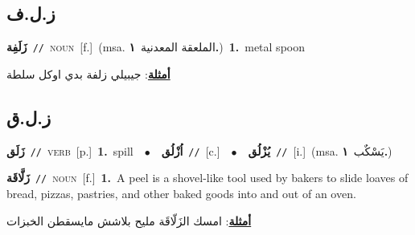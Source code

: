 \documentclass[10pt,a4paper,twoside]{article} %
\begin{document}
\begin{multicols}{2}
\vspace{-3mm}
\subsection*{\color{blue}\foreignlanguage{arabic}{ز.ل.ف}\color{blue}{}} 

{\setlength\topsep{0pt}\textbf{\foreignlanguage{arabic}{زَلَفِة}}\ {\color{gray}\texttt{//}\color{black}}\ \textsc{noun}\ [f.]\ \color{gray}(msa. \foreignlanguage{arabic}{الملعقة المعدنية}~\foreignlanguage{arabic}{\textbf{١.}})\color{black}\ \textbf{1.}~metal spoon\  \begin{flushright}\color{gray}\foreignlanguage{arabic}{\textbf{\underline{\foreignlanguage{arabic}{أمثلة}}}: جيبيلي زلفة بدي اوكل سلطة}\end{flushright}\color{black}} \vspace{2mm}

\vspace{-3mm}
\subsection*{\color{blue}\foreignlanguage{arabic}{ز.ل.ق}\color{blue}{}} 

{\setlength\topsep{0pt}\textbf{\foreignlanguage{arabic}{زَلَق}}\ {\color{gray}\texttt{//}\color{black}}\ \textsc{verb}\ [p.]\ \textbf{1.}~spill\ \ $\bullet$\ \ \setlength\topsep{0pt}\textbf{\foreignlanguage{arabic}{اُزْلُق}}\ {\color{gray}\texttt{//}\color{black}}\ [c.]\ \ $\bullet$\ \ \setlength\topsep{0pt}\textbf{\foreignlanguage{arabic}{يُزْلُق}}\ {\color{gray}\texttt{//}\color{black}}\ [i.]\ \color{gray}(msa. \foreignlanguage{arabic}{يَسْكٌب}~\foreignlanguage{arabic}{\textbf{١.}})\color{black}\ } \vspace{2mm}

{\setlength\topsep{0pt}\textbf{\foreignlanguage{arabic}{زَلَّاقَة}}\ {\color{gray}\texttt{//}\color{black}}\ \textsc{noun}\ [f.]\ \textbf{1.}~A peel is a shovel-like tool used by bakers to slide loaves of bread, pizzas, pastries, and other baked goods into and out of an oven.\  \begin{flushright}\color{gray}\foreignlanguage{arabic}{\textbf{\underline{\foreignlanguage{arabic}{أمثلة}}}: امسك الزَلّاقَة مليح بلاشش مايسقطن الخبزات}\end{flushright}\color{black}} \vspace{2mm}


\end{multicols}
\end{document}
